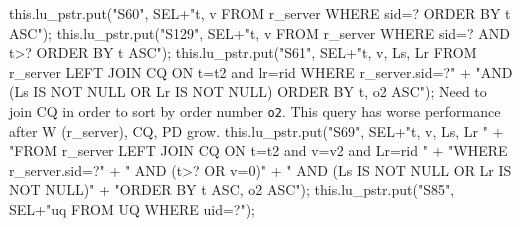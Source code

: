 \eatline
{}\nwendcode{}\endmoddef{}
this.lu_pstr.put("S60", SEL+"t, v FROM r_server WHERE sid=? ORDER BY t ASC");
\eatline
{}\nwendcode{}\endmoddef{}
this.lu_pstr.put("S129", SEL+"t, v FROM r_server WHERE sid=? AND t>? ORDER BY t ASC");
\eatline
{}\nwendcode{}\endmoddef{}
this.lu_pstr.put("S61", SEL+"t, v, Ls, Lr FROM r_server LEFT JOIN CQ ON t=t2 and lr=rid WHERE r_server.sid=?"
      + "AND (Ls IS NOT NULL OR Lr IS NOT NULL) ORDER BY t, o2 ASC");
\eatline
{}\nwendcode{}Need to join CQ in order to sort by order number {\tt{}o2}. This query has
worse performance after W (r\_server), CQ, PD grow.
\nwenddocs{}\endmoddef{}
this.lu_pstr.put("S69", SEL+"t, v, Ls, Lr "
      + "FROM r_server LEFT JOIN CQ ON t=t2 and v=v2 and Lr=rid "
      + "WHERE r_server.sid=?"
      + "   AND (t>? OR v=0)"
      + "   AND (Ls IS NOT NULL OR Lr IS NOT NULL)"
      + "ORDER BY t ASC, o2 ASC");
\eatline
{}\nwendcode{}\endmoddef{}
this.lu_pstr.put("S85", SEL+"uq FROM UQ WHERE uid=?");
\eatline
